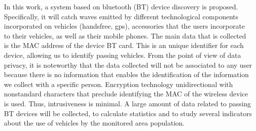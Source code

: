 \documentclass{llncs}
\begin{document}
In this work, a system based on bluetooth (BT) device discovery is proposed. 
Specifically, it will catch waves emitted by different technological components incorporated on vehicles (handsfree, gps), accessories that the users incorporate to their vehicles, as well as their mobile phones.
The main data that is collected is the MAC address of the device BT card.
This is an unique identifier for each device, allowing us to identify passing vehicles.
From the point of view of data privacy, it is noteworthy that the data collected will not be associated to any user because there is no information that enables the identification of the information we collect with a specific person. 
Encryption technology unidirectional with nonstandard characters that preclude identifying the MAC of the wireless device is used. Thus, intrusiveness is minimal.
A large amount of data related to passing BT devices will be collected, to calculate statistics and to study several indicators about the use of vehicles by the monitored area population.

\end{document}
